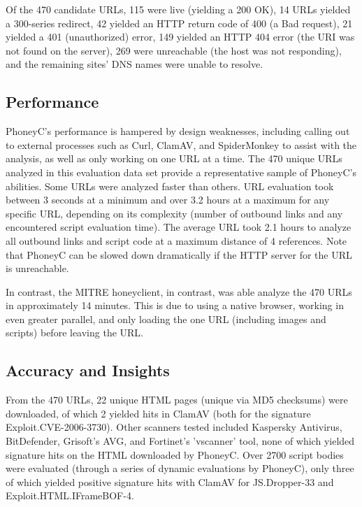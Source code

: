 \documentclass[10pt,twocolumn]{article}
\begin{document}
Of the 470 candidate URLs, 115 were live (yielding a 200 OK), 14 URLs yielded a 300-series redirect, 42 yielded an HTTP return code of 400 (a Bad request), 21 yielded a 401 (unauthorized) error, 149 yielded an HTTP 404 error (the URI was not found on the server), 269 were unreachable (the host was not responding), and the remaining sites' DNS names were unable to resolve. 

\subsection{Performance}
\label{performance}

PhoneyC's performance is hampered by design weaknesses, including calling out to external processes such as Curl, ClamAV, and SpiderMonkey to assist with the analysis, as well as only working on one URL at a time. The 470 unique URLs analyzed in this evaluation data set provide a representative sample of PhoneyC's abilities. Some URLs were analyzed faster than others. URL evaluation took between 3 seconds at a minimum and over 3.2 hours at a maximum for any specific URL, depending on its complexity (number of outbound links and any encountered script evaluation time). The average URL took 2.1 hours to analyze all outbound links and script code at a maximum distance of 4 references. Note that PhoneyC can be slowed down dramatically if the HTTP server for the URL is unreachable. 

In contrast, the MITRE honeyclient, in contrast, was able analyze the 470 URLs in approximately 14 minutes. This is due to using a native browser, working in even greater parallel, and only loading the one URL (including images and scripts) before leaving the URL. 

\subsection{Accuracy and Insights}
\label{accuracy}

From the 470 URLs, 22 unique HTML pages (unique via MD5 checksums) were downloaded, of which 2 yielded hits in ClamAV (both for the signature Exploit.CVE-2006-3730).  Other scanners tested included Kaspersky Antivirus, BitDefender, Grisoft's AVG, and Fortinet's 'vscanner' tool, none of which yielded signature hits on the HTML downloaded by PhoneyC. Over 2700 script bodies were evaluated (through a series of dynamic evaluations by PhoneyC), only three of which yielded positive signature hits with ClamAV for JS.Dropper-33 and Exploit.HTML.IFrameBOF-4. 
\end{document}
